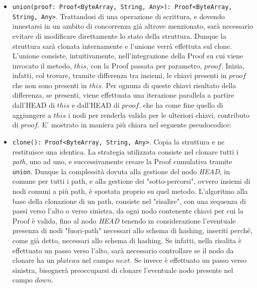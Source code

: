 \begin{itemize}
			\item \verb!union(proof: Proof<ByteArray, String, Any>): Proof<ByteArray, String, Any>!. Trattandosi di una operazione di scrittura, e dovendo innestarsi in un ambito di concorrenza già altrove menzionato, sarà necessario evitare di modificare direttamente lo stato della struttura. Dunque la struttura sarà clonata internamente e l'unione verrà effettuta sul clone. L'unione consiste, intuitivamente, nell'integrazione della Proof su cui viene invocato il metodo, $ this $, con la Proof passata per parametro, $ proof $. Inizia, infatti, col trovare, tramite differenza tra insiemi, le chiavi presenti in $ proof $ che non sono presenti in $ this $. Per ognuna di queste chiavi risultato della differenza, se presenti, viene effettuata una iterazione parallela a partire dall'HEAD di $ this $ e dall'HEAD di $ proof $. che ha come fine quello di aggiungere a $ this $ i nodi per renderla valida per le ulteriori chiavi, contributo di $ proof $. E' mostrato in maniera più chiara nel seguente pseudocodice:
		
			\begin{algorithm}[H]
			\end{algorithm}
			
			\item \verb!clone(): Proof<ByteArray, String, Any>!. Copia la struttura e ne restituisce una identica. La strategia utilizzata consiste nel clonare tutti i \textit{path}, uno ad uno, e successivamente creare la Proof cumulativa tramite \verb!union!. Dunque la complessità dovuta alla gestione del nodo \textit{HEAD}, in comune per tutti i path, e alla gestione dei "sotto-percorsi", ovvero insiemi di nodi comuni a più path, è spostata proprio su quel metodo. L'algoritmo alla base della clonazione di un path, consiste nel "risalire", con una sequenza di passi verso l'alto o verso sinistra, da ogni nodo contenente chiavi per cui la Proof è valida, fino al nodo \textit{HEAD} tenendo in considerazione l'eventuale presenza di nodi "fuori-path" necessari allo schema di hashing, inseriti perché, come già detto, necessari allo schema di hashing. Se infatti, nella risalita è effettuato un passo verso l'alto, sarà necessario controllare se il nodo da clonare ha un $ plateau $ nel campo $ next $. Se invece è effettuato un passo verso sinistra, bisognerà preoccuparsi di clonare l'eventuale nodo presente nel campo $ down $.
			
		\end{itemize}

